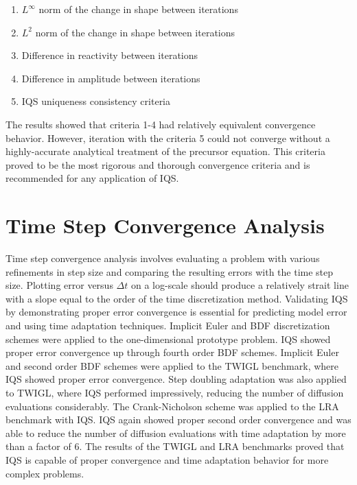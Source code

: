 \begin{enumerate}
\item $L^\infty$ norm of the change in shape between iterations
\item $L^2$ norm of the change in shape between iterations
\item Difference in reactivity between iterations
\item Difference in amplitude between iterations
\item IQS uniqueness consistency criteria
\end{enumerate}

The results showed that criteria 1-4 had relatively equivalent convergence behavior. However, iteration with the criteria 5 could not converge without a highly-accurate analytical treatment of the precursor equation. This criteria proved to be the most rigorous and thorough convergence criteria and is recommended for any application of IQS.

\section{Time Step Convergence Analysis}

Time step convergence analysis involves evaluating a problem with various refinements in step size and comparing the resulting errors with the time step size. Plotting error versus $\Delta t$ on a log-scale should produce a relatively strait line with a slope equal to the order of the time discretization method. 
Validating IQS by demonstrating proper error convergence is essential for predicting model error and using time adaptation techniques. Implicit Euler and BDF discretization schemes were applied to the one-dimensional prototype problem. IQS showed proper error convergence up through fourth order BDF schemes. Implicit Euler and second order BDF schemes were applied to the TWIGL benchmark, where IQS showed proper error convergence. Step doubling adaptation was also applied to TWIGL, where IQS performed impressively, reducing the number of diffusion evaluations considerably. The Crank-Nicholson scheme was applied to the LRA benchmark with IQS. IQS again showed proper second order convergence and was able to reduce the number of diffusion evaluations with time adaptation by more than a factor of 6. The results of the TWIGL and LRA benchmarks proved that IQS is capable of proper convergence and time adaptation behavior for more complex problems.

